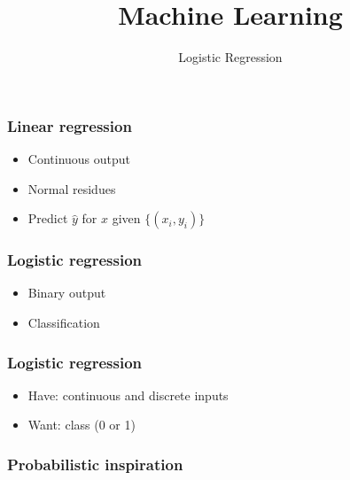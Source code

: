 
\title
{Machine Learning}
\subtitle{Logistic Regression}




\begin{frame}
  \titlepage
\end{frame}


\begin{frame}
  \frametitle{Linear regression}
  \begin{bphrase}
    \begin{itemize}
    \item Continuous output
    \item Normal residues
    \item Predict $\hat{y}$ for $x$ given $\{(x_i, y_i)\}$
    \end{itemize}
  \end{bphrase}
\end{frame}

\begin{frame}
  \frametitle{Logistic regression}
  \begin{bphrase}
    \begin{itemize}
    \item Binary output
    \item Classification
    \end{itemize}
  \end{bphrase}
\end{frame}

\begin{frame}
  \frametitle{Logistic regression}
  \begin{itemize}
  \item Have: continuous and discrete inputs
  \item Want: class (0 or 1)
  \end{itemize}
\end{frame}

\begin{frame}
  \frametitle{Probabilistic inspiration}

\end{frame}

